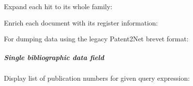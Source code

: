 \documentclass[letterpaper,10pt,english]{sphinxmanual}
\begin{document}
Expand each hit to its whole family:

\begin{sphinxVerbatim}[commandchars=\\\{\}]
    
\end{sphinxVerbatim}

Enrich each document with its register information:

\begin{sphinxVerbatim}[commandchars=\\\{\}]
     
\end{sphinxVerbatim}

For dumping data using the legacy Patent2Net brevet format:

\begin{sphinxVerbatim}[commandchars=\\\{\}]
    
\end{sphinxVerbatim}


\subparagraph{Single bibliographic data field}
\label{\detokenize{usage/adhoc:single-bibliographic-data-field}}
Display list of publication numbers for given query expression:

\begin{sphinxVerbatim}[commandchars=\\\{\}]
   
    
\end{sphinxVerbatim}
\end{document}
